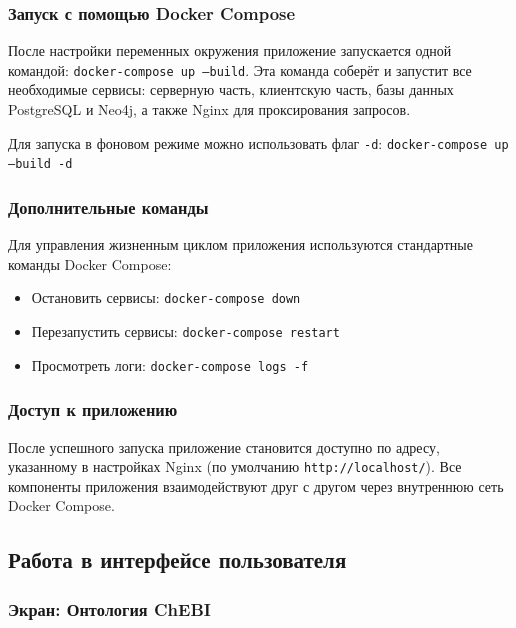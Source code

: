 \documentclass[a4paper,12pt,reqno]{article}
\begin{document}
\subsubsection{Запуск с помощью Docker Compose}

После настройки переменных окружения приложение запускается одной командой: \texttt{docker-compose up --build}.
Эта команда соберёт и запустит все необходимые сервисы: серверную часть, клиентскую часть, базы данных PostgreSQL и Neo4j, а также Nginx для проксирования запросов.

Для запуска в фоновом режиме можно использовать флаг \texttt{-d}: \texttt{docker-compose up --build -d}

\subsubsection{Дополнительные команды}

Для управления жизненным циклом приложения используются стандартные команды Docker Compose:
\begin{itemize}
    \item Остановить сервисы: \texttt{docker-compose down}
    \item Перезапустить сервисы: \texttt{docker-compose restart}
    \item Просмотреть логи: \texttt{docker-compose logs -f}
\end{itemize}

\subsubsection{Доступ к приложению}

После успешного запуска приложение становится доступно по адресу, указанному в настройках Nginx (по умолчанию \texttt{http://localhost/}).
Все компоненты приложения взаимодействуют друг с другом через внутреннюю сеть Docker Compose.

\subsection{Работа в интерфейсе пользователя}

\subsubsection{Экран: Онтология ChEBI}
\end{document}
